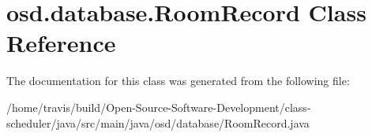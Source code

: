 \hypertarget{classosd_1_1database_1_1_room_record}{\section{osd.\-database.\-Room\-Record Class Reference}
\label{classosd_1_1database_1_1_room_record}
}


The documentation for this class was generated from the following file\-:\begin{DoxyCompactItemize}
\item 
/home/travis/build/\-Open-\/\-Source-\/\-Software-\/\-Development/class-\/scheduler/java/src/main/java/osd/database/Room\-Record.\-java\end{DoxyCompactItemize}
